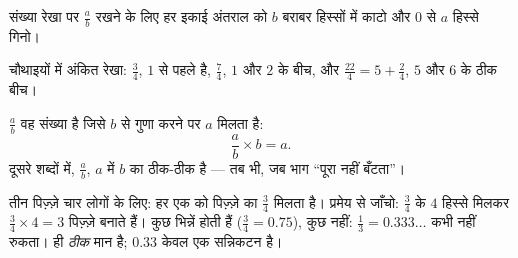 \begin{proposition}[संख्या रेखा पर भिन्नें]\label{prop:g6:fractions:line}
संख्या रेखा पर $\frac ab$ रखने के लिए हर इकाई अंतराल को $b$
बराबर हिस्सों में काटो और $0$ से $a$ हिस्से गिनो।
\end{proposition}

\begin{omfigure}

{\small चौथाइयों में अंकित रेखा: $\frac34$, $1$ से पहले है,
$\frac74$, $1$ और $2$ के बीच, और $\frac{22}{4} = 5 + \frac24$,
$5$ और $6$ के ठीक बीच।}
\end{omfigure}

\begin{theorem}[भिन्न एक भाग है]\label{thm:g6:fractions:quotient}
 $\frac ab$ वह संख्या है जिसे $b$ से गुणा करने पर $a$
मिलता है:
\[
\frac ab \times b = a .
\]
दूसरे शब्दों में, $\frac ab$, $a$ में $b$ का ठीक-ठीक 
है --- तब भी, जब भाग ``पूरा नहीं बँटता''।
\end{theorem}
\admitted

\begin{example}\label{ex:g6:fractions:pizzas}
तीन पिज़्ज़े चार लोगों के लिए: हर एक को पिज़्ज़े का $\frac34$
मिलता है। प्रमेय से जाँचो: $\frac34$ के $4$ हिस्से मिलकर
$\frac34 \times 4 = 3$ पिज़्ज़े बनाते हैं। कुछ भिन्नें  होती हैं ($\frac34 = 0.75$), कुछ नहीं: $\frac13 = 0.333\dots$
कभी नहीं रुकता।  ही \emph{ठीक} मान है; $0.33$ केवल एक सन्निकटन है।
\end{example}

